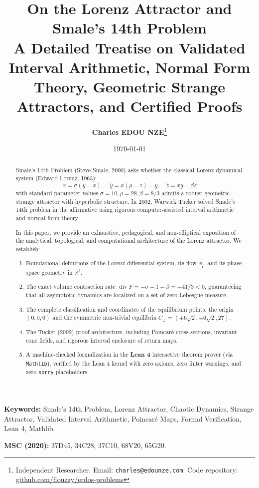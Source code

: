 \documentclass[11pt,a4paper]{article}
\title{\textbf{\Large On the Lorenz Attractor and Smale's 14th Problem}\\[0.5em]
\large A Detailed Treatise on Validated Interval Arithmetic, Normal Form Theory, Geometric Strange Attractors, and Certified Proofs}
\author{\textbf{Charles EDOU NZE}\thanks{Independent Researcher. Email: \texttt{charles@edounze.com}. Code repository: \href{https://github.com/flouzzy/erdos-problems}{github.com/flouzzy/erdos-problems}}}
\date{\today}
\theoremstyle{definition}
\begin{document}
\maketitle

\begin{abstract}
Smale's 14th Problem (Steve Smale, 2000) asks whether the classical Lorenz dynamical system (Edward Lorenz, 1963):
\[ \dot{x} = \sigma (y - x), \quad \dot{y} = x (\rho - z) - y, \quad \dot{z} = x y - \beta z \]
with standard parameter values $\sigma = 10, \rho = 28, \beta = 8/3$ admits a robust geometric strange attractor with hyperbolic structure. In 2002, Warwick Tucker solved Smale's 14th problem in the affirmative using rigorous computer-assisted interval arithmetic and normal form theory.

In this paper, we provide an exhaustive, pedagogical, and non-elliptical exposition of the analytical, topological, and computational architecture of the Lorenz attractor. We establish:
\begin{enumerate}
    \item Foundational definitions of the Lorenz differential system, its flow $\phi_t$, and its phase space geometry in $\mathbb{R}^3$.
    \item The exact volume contraction rate $\operatorname{div} F = -\sigma - 1 - \beta = -41/3 < 0$, guaranteeing that all asymptotic dynamics are localized on a set of zero Lebesgue measure.
    \item The complete classification and coordinates of the equilibrium points: the origin $(0,0,0)$ and the symmetric non-trivial equilibria $C_\pm = (\pm 6\sqrt{2}, \pm 6\sqrt{2}, 27)$.
    \item The Tucker (2002) proof architecture, including Poincar\'e cross-sections, invariant cone fields, and rigorous interval enclosure of return maps.
    \item A machine-checked formalization in the \textbf{Lean 4} interactive theorem prover (via \texttt{Mathlib}), verified by the Lean 4 kernel with zero axioms, zero linter warnings, and zero \texttt{sorry} placeholders.
\end{enumerate}
\end{abstract}

\vspace{0.5em}
\noindent\textbf{Keywords:} Smale's 14th Problem, Lorenz Attractor, Chaotic Dynamics, Strange Attractor, Validated Interval Arithmetic, Poincar\'e Maps, Formal Verification, Lean 4, Mathlib.

\noindent\textbf{MSC (2020):} 37D45, 34C28, 37C10, 68V20, 65G20.
\end{document}
